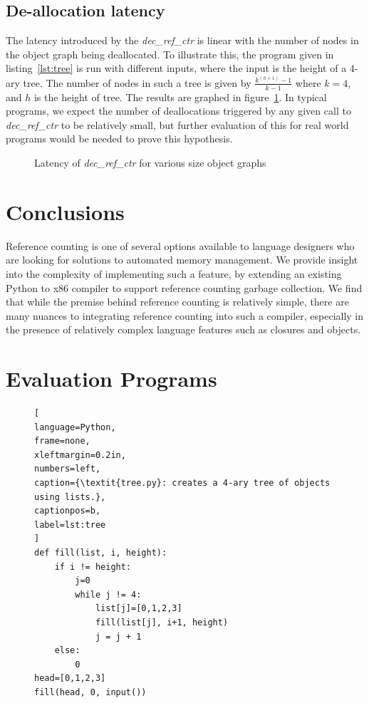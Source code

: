 \documentclass{sigplanconf}
\begin{document}
\subsection{De-allocation latency}

The latency introduced by the \textit{dec\_ref\_ctr} is linear with the number of nodes in the object graph being deallocated.  To illustrate this, the program given in listing~\ref{lst:tree} is run with different inputs, where the input is the height of a 4-ary tree.  The number of nodes in such a tree is given by $\frac{{k}^{\left(h+1\right)}-1}{k-1}$ where $k=4$, and $h$ is the height of tree.  The results are graphed in figure~\ref{fig:treelatency}.  In typical programs, we expect the number of deallocations triggered by any given call to \textit{dec\_ref\_ctr} to be relatively small, but further evaluation of this for real world programs would be needed to prove this hypothesis.

\begin{figure}
\normalsize %

\caption{Latency of \textit{dec\_ref\_ctr} for various size object graphs}
\label{fig:treelatency}
\end{figure}

\section{Conclusions}
\label{sec:conclusion}

Reference counting is one of several options available to language designers who are looking for solutions to automated memory management.  We provide insight into the complexity of implementing such a feature, by extending an existing Python to x86 compiler to support reference counting garbage collection.  We find that while the premise behind reference counting is relatively simple, there are many nuances to integrating reference counting into such a compiler, especially in the presence of relatively complex language features such as closures and objects.

\appendix
\section{Evaluation Programs}

\begin{figure}[h]
\begin{lstlisting}[
language=Python,
frame=none,
xleftmargin=0.2in,
numbers=left,
caption={\textit{tree.py}: creates a 4-ary tree of objects using lists.},
captionpos=b,
label=lst:tree
]
def fill(list, i, height):
    if i != height:
        j=0
        while j != 4:
            list[j]=[0,1,2,3]
            fill(list[j], i+1, height)
            j = j + 1
    else:
        0
head=[0,1,2,3]
fill(head, 0, input())
\end{lstlisting}
\end{figure}
\end{document}
